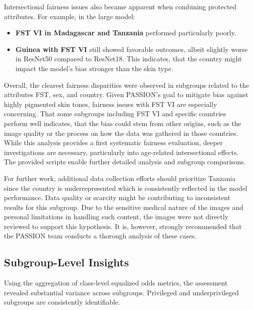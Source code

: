 \documentclass[12pt, a4paper, oneside]{book}   	%
\renewcommand{\todo}[1]{\textcolor{red}{TODO: #1}}
\begin{document}
		Intersectional fairness issues also became apparent when combining protected attributes. For example, in the large model:
		\begin{itemize}
			\item \textbf{\gls{FST} VI in Madagascar and Tanzania} performed particularly poorly.
			\item \textbf{Guinea with \gls{FST} VI} still showed favorable outcomes, albeit slightly worse in ResNet50 compared to ResNet18. This indicates, that the country might impact the model's bias stronger than the skin type.
		\end{itemize}
		
		Overall, the clearest fairness disparities were observed in subgroups related to the attributes \gls{FST}, sex, and country. Given PASSION’s goal to mitigate bias against highly pigmented skin tones, fairness issues with \gls{FST} VI are especially concerning. That some subgroups including \gls{FST} VI and specific countries perform well indicates, that the bias could stem from other origins, such as the image quality or the process on how the data was gathered in those countries. While this analysis provides a first systematic fairness evaluation, deeper investigations are necessary, particularly into age-related intersectional effects. The provided scripts enable further detailed analysis and subgroup comparisons.
		
		For further work,  additional data collection efforts should prioritize Tanzania since the country is underrepresented which is consistently reflected in the model performance. Data quality or scarcity might be contributing to inconsistent results for this subgroup. Due to the sensitive medical nature of the images and personal limitations in handling such content, the images were not directly reviewed to support this hypothesis. It is, however, strongly recommended that the PASSION team conducts a thorough analysis of these cases.
		
		
		\subsection{Subgroup-Level Insights}
		Using the aggregation of class-level equalized odds metrics, the assessment revealed substantial variance across subgroups. Privileged and underprivileged subgroups are consistently identifiable.
		
\end{document}

